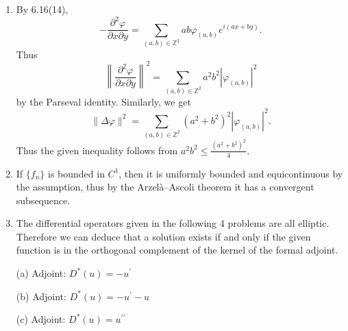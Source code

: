 \begin{enumerate}
The general case is similar. By definition,
\[d \alpha=(-1)^{p} \sum_{i=p+1}^{n} \frac{\partial f}{\partial x_{i}} dx_{1} \wedge \ldots \wedge dx_{p} \wedge dx_{i},\]
and \[* \alpha=f dx_{p+1} \wedge \ldots \wedge dx_{n}\]
(assuming $* 1=dx_{1} \wedge \ldots \wedge dx_{n}$). Also
\[\delta \alpha=(-1)^{n(p+1)+1} * d * \alpha
=(-1)^{n(p+1)+1} \sum_{i=1}^{p}(-1)^{p(i-1)+(p-1)(p-i)} \frac{\partial f}{\partial x_{i}} dx_{1} \wedge \ldots \wedge \widehat{dx}_{i} \wedge \ldots \wedge dx_{p}.\]
Furthermore, by tedious calculation, we get
\[\Delta \alpha=-\sum_{i=1}^{n} \frac{\partial^{2} f}{\partial x_{i}^{2}} dx_{1} \wedge \ldots \wedge dx_{p}.\]
\item By 6.16(14),
\[-\frac{\partial^{2} \varphi}{\partial x \partial y}
=\sum_{(a, b) \in \mathbb{Z}^{2}} a b \varphi_{(a, b)} e^{i(a x+b y)}.\]
Thus \[\left\|\frac{\partial^{2} \varphi}{\partial x \partial y}\right\|^{2}
=\sum_{(a, b) \in \mathbb{Z}^{2}} a^{2} b^{2}|\varphi_{(a, b)}|^{2}\]
by the Parseval identity. Similarly, we get
\[\|\Delta \varphi\|^{2}=\sum_{(a, b) \in \mathbb{Z}^{2}}(a^{2}+b^{2})^{2}|\varphi_{(a, b)}|^{2}.\]
Thus the given inequality follows from $a^{2} b^{2} \leq \frac{(a^{2}+b^{2})^{2}}{4}$.
\item If $\{f_{n}\}$ is bounded in $C^{1}$, then it is uniformly bounded and equicontinuous by the assumption, 
thus by the Arzelà--Ascoli theorem it has a convergent subsequence.
\item The differential operators given in the following 4 problems are all elliptic. 
Therefore we can deduce that a solution exists if and only if 
the given function is in the orthogonal complement of the kernel of the formal adjoint.

(a) Adjoint: $D^{*}(u)=-u^{\prime}$

(b) Adjoint: $D^{*}(u)=-u^{\prime}-u$

(c) Adjoint: $D^{*}(u)=u^{\prime \prime}$


\end{enumerate}
